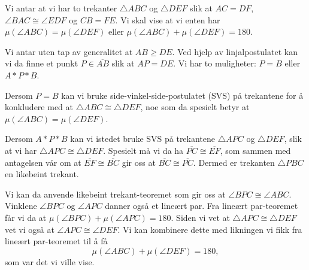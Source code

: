 

\begin{oppgave}[4.2.3]
    Vi antar at vi har to trekanter $\triangle ABC$ og $\triangle DEF$ slik at $AC=DF$, $\angle BAC\cong \angle EDF$ og $CB=FE$. 
    Vi skal vise at vi enten har $\mu(\angle ABC) = \mu(\angle DEF)$ eller $\mu(\angle ABC) + \mu(\angle DEF)=180$. 
    
    Vi antar uten tap av generalitet at  $AB\geq DE$. 
    Ved hjelp av linjalpostulatet kan vi da finne et punkt $P\in \overline{AB}$ slik at $AP=DE$. 
    Vi har to muligheter: $P=B$ eller $A\ast P\ast B$.

    Dersom $P=B$ kan vi bruke side-vinkel-side-postulatet (SVS) på trekantene for å konkludere med at $\triangle ABC \cong \triangle DEF$, noe som da spesielt betyr at  $\mu(\angle ABC) = \mu(\angle DEF)$.

    Dersom $A\ast P\ast B$ kan vi istedet bruke SVS på trekantene $\triangle APC$ og $\triangle DEF$, slik at vi har $\triangle APC\cong \triangle DEF$.
    Spesielt må vi da ha $\overline{PC}\cong \overline{EF}$, som sammen med antagelsen vår om at $\overline{EF}\cong \overline{BC}$ gir oss at $\overline{BC}\cong \overline{PC}$.
    Dermed er trekanten $\triangle PBC$ en likebeint trekant. 

    \begin{figure}[H]
        \centering
        
    \end{figure}

    Vi kan da anvende likebeint trekant-teoremet som gir oss at $\angle BPC \cong \angle ABC$. 
    Vinklene $\angle BPC$ og $\angle APC$ danner også et lineært par. 
    Fra lineært par-teoremet får vi da at $\mu(\angle BPC)+\mu(\angle APC)=180$. 
    Siden vi vet at $\triangle APC\cong \triangle DEF$ vet vi også at $\angle APC\cong\angle DEF$. 
    Vi kan kombinere dette med likningen vi fikk fra lineært par-teoremet til å få $$\mu(\angle ABC)+\mu(\angle DEF)=180,$$ som var det vi ville vise.

\end{oppgave}


